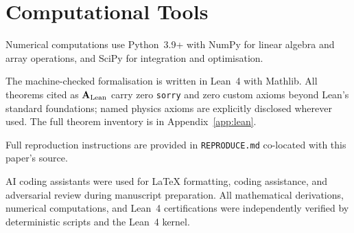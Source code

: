 \documentclass[11pt]{article}
\theoremstyle{remark}
\newcommand{\CatAL}{\ensuremath{\textbf{A}_{\rm Lean}}}
\begin{document}
\section*{Computational Tools}

Numerical computations use Python~3.9+ with NumPy for linear algebra and
array operations, and SciPy for integration and optimisation.

The machine-checked formalisation is written in Lean~4 with Mathlib.
All theorems cited as $\CatAL$ carry zero \texttt{sorry} and zero custom
axioms beyond Lean's standard foundations; named physics axioms are
explicitly disclosed wherever used. The full theorem inventory is in
Appendix~\ref{app:lean}.

Full reproduction instructions are provided in \texttt{REPRODUCE.md} co-located with this paper's source.

AI coding assistants were used for LaTeX formatting, coding assistance, and adversarial review during manuscript preparation. All mathematical derivations, numerical computations, and Lean~4 certifications were independently verified by deterministic scripts and the Lean~4 kernel.



\end{document}
